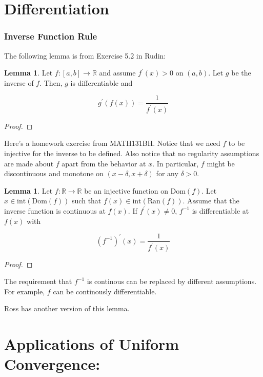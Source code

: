 \documentclass{article}
\theoremstyle{definition}
\newtheorem{lemma}[theorem]{Lemma}
\newcommand{\R}{\mathbb{R}}
\newcommand{\fdiff}{f^{\prime}}
\newcommand{\interior}{\text{int}}
\newcommand{\dom}{\text{Dom}}
\newcommand{\ran}{\text{Ran}}
\begin{document}
\section{Differentiation}

\subsubsection{Inverse Function Rule}

The following lemma is from Exercise 5.2 in Rudin:

\begin{lemma}
    Let $f: [a,b] \xrightarrow{} \R$ and assume
    $\fdiff(x) > 0$ on $(a,b)$. Let $g$ be the inverse of $f$.
    Then, $g$ is differentiable and
    
    \[ g^{\prime}(f(x)) = \frac{1}{\fdiff(x)} \]
\end{lemma}
\begin{proof}

\end{proof}

Here's a homework exercise from MATH131BH.
Notice that we need $f$ to be injective for the
inverse to be defined. Also notice that no regularity
assumptions are made about $f$ apart from the
behavior at $x$. In particular, $f$ might be discontinuous
and monotone on $(x - \delta, x + \delta)$ for any $\delta > 0$.

\begin{lemma}
    Let $f: \R \xrightarrow{} \R$ be an injective function on $\dom(f)$. Let $x \in \interior(\dom(f))$
    such that $f(x) \in \interior(\ran(f))$. Assume that 
    the inverse function is continuous at $f(x)$.
    If $\fdiff(x) \neq 0$, $f^{-1}$ is differentiable at $f(x)$
    with

    \[ (f^{-1})^{\prime}(x) = \frac{1}{\fdiff(x)} \]
\end{lemma}
\begin{proof}
    
\end{proof}

The requirement that $f^{-1}$ is continous can be replaced
by different assumptions. For example, $f$ can be continously differentiable.

Ross has another version of this lemma.

\newpage

\section{Applications of Uniform Convergence: }
\end{document}
